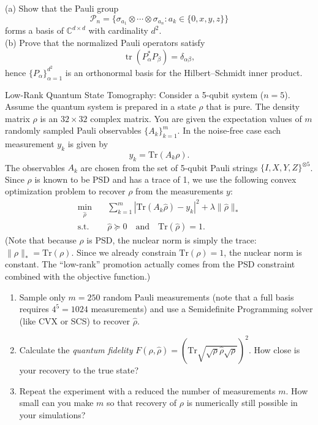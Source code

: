 \begin{myexercise}\label{ex:pauli}
(a) Show that the Pauli group
$$
\mathcal{P}_{n} = \big\{ 
\sigma_{a_1} \otimes \cdots \otimes \sigma_{a_n} : a_k \in \{0,x,y,z\} \big\}
$$
forms a basis of $\mathbb{C}^{d\times d}$ with cardinality $d^2$. \\
(b) Prove that the normalized Pauli operators satisfy
$$
\operatorname{tr}(P_\alpha^\ast P_\beta) = \delta_{\alpha\beta},
$$
hence $\{P_\alpha\}_{\alpha=1}^{d^2}$ is an orthonormal basis for the Hilbert–Schmidt inner product.
\end{myexercise}


\begin{myexercise}
Low-Rank Quantum State Tomography:
Consider a 5-qubit system ($n=5$).  Assume the quantum system is prepared in a state $\rho$ that is pure. The density matrix $\rho$ is an $32 \times 32$ complex matrix.
You are given the expectation values of $m$ randomly sampled Pauli observables $\{A_k\}_{k=1}^m$. In the noise-free case each measurement $y_k$ is given by
$$y_k = \text{Tr}(A_k \rho).$$
The observables $A_k$ are chosen from the set of 5-qubit Pauli strings $\{I, X, Y, Z\}^{\otimes 5}$.
Since $\rho$ is known to be PSD and has a trace of 1, we use the following convex optimization problem to recover $\rho$ from the measurements $y$:
\begin{align*}
\min_{\hat{\rho}} & \quad \sum_{k=1}^m |\text{Tr}(A_k \hat{\rho}) - y_k|^2 + \lambda \|\hat{\rho}\|_* \\ \text{s.t.} & \quad \hat{\rho} \succeq 0 \quad \text{and} \quad \text{Tr}(\hat{\rho}) = 1.
\end{align*}
(Note that because $\rho$ is PSD, the nuclear norm is simply the trace: $\|\rho\|_* = \text{Tr}(\rho)$. Since we already constrain $\text{Tr}(\rho) = 1$, the nuclear norm is constant. The ``low-rank'' promotion actually comes from the PSD constraint combined with the objective function.)

\begin{enumerate}[label=(\alph*)]
\item Sample only $m = 250$ random Pauli measurements (note that a full basis requires $4^5 = 1024$ measurements) and use a Semidefinite Programming  solver (like CVX or SCS) to recover $\hat{\rho}$.
\item Calculate the {\em quantum fidelity} $F(\rho, \hat{\rho}) = \left( \text{Tr} \sqrt{\sqrt{\rho} \hat{\rho} \sqrt{\rho}} \right)^2$. How close is your recovery to the true state?
\item Repeat the experiment with a reduced the number of measurements $m$. How small can you make $m$ so that recovery of $\rho$ is numerically still possible in your simulations?
\end{enumerate}
\end{myexercise}


